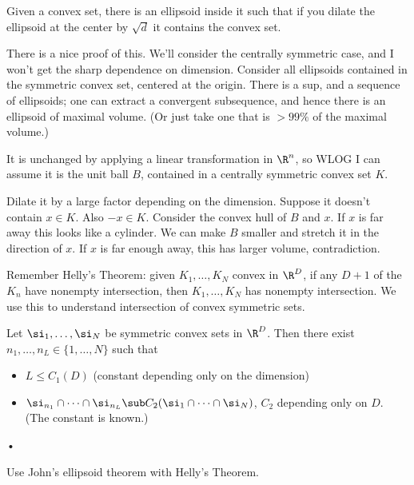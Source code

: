 Given a convex set, there is an ellipsoid inside it such that if you dilate the ellipsoid at the center by $\sqrt d$ it contains the convex set.

There is a nice proof of this. We'll consider the centrally symmetric case, and 
I won't get the sharp dependence on dimension.
Consider all ellipsoids contained in the symmetric convex set, centered at the origin. There is a sup, and a sequence of ellipsoids; one can extract a convergent subsequence, and hence there is an ellipsoid of maximal volume.
(Or just take one that is $>99\%$ of the maximal volume.)

It is unchanged by applying a linear transformation in $\R^n$, so WLOG I can assume it is the unit ball $B$, contained in a centrally symmetric convex set $K$.

Dilate it by a large factor depending on the dimension. Suppose it doesn't contain $x\in K$. Also $-x\in K$. Consider the convex hull of $B$ and $x$. If $x$ is far away this looks like a cylinder. We can make $B$ smaller and stretch it in the direction of $x$. If $x$ is far enough away, this has larger volume, contradiction.

Remember Helly's Theorem: given $K_1,\ldots, K_N$ convex in $\R^D$, if any $D+1$ of the $K_n$ have nonempty intersection, then $K_1,\ldots, K_N$ has nonempty intersection. We use this to understand intersection of convex symmetric sets.
\begin{cor}
Let $\si_1,\ldots, \si_N$ be symmetric convex sets in $\R^D$. Then there exist $n_1,\ldots, n_L\in \{1,\ldots, N\}$ such that 
\begin{itemize}
\item
$L\le C_1(D)$ (constant depending only on the dimension)
\item
$\si_{n_1}\cap \cdots \cap \si_{n_L}\sub C_2 (\si_1\cap \cdots \cap \si_N)$, $C_2$ depending only on $D$. (The constant is known.) %
\end{itemize}•
\end{cor}
Use John's ellipsoid theorem with Helly's Theorem. %
